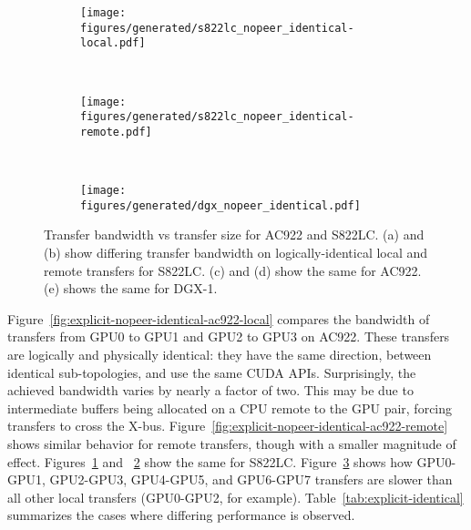 \begin{figure}[ht]
	\centering
	\begin{subfigure}[b]{0.4\textwidth}
		\texttt{[image: figures/generated/s822lc\_nopeer\_identical-local.pdf]}
		\caption{}
		\label{fig:explicit-nopeer-identical-s822lc-local}
	\end{subfigure}
	~
	\begin{subfigure}[b]{0.4\textwidth}
		\texttt{[image: figures/generated/s822lc\_nopeer\_identical-remote.pdf]}
		\caption{}
		\label{fig:explicit-nopeer-identical-s822lc-remote}
	\end{subfigure}
	\\
	\begin{subfigure}[b]{0.4\textwidth}
		\texttt{[image: figures/generated/dgx\_nopeer\_identical.pdf]}
		\caption{}
		\label{fig:explicit-nopeer-identical-dgx}
	\end{subfigure}
	\caption[GPU-GPU \texttt{cudaMemcpy} Bandwidth on Identical Links]{
		Transfer bandwidth vs transfer size for AC922 and S822LC.
		(a) and (b) show differing transfer bandwidth on logically-identical local and remote transfers for S822LC.
		(c) and (d) show the same for AC922.
		(e) shows the same for DGX-1.
	}
	\label{fig:explicit-nopeer-identical}
\end{figure}

Figure~\ref{fig:explicit-nopeer-identical-ac922-local} compares the bandwidth of transfers from GPU0 to GPU1 and GPU2 to GPU3 on AC922.
These transfers are logically and physically identical: they have the same direction, between identical sub-topologies, and use the same CUDA APIs.
Surprisingly, the achieved bandwidth varies by nearly a factor of two.
This may be due to intermediate buffers being allocated on a CPU remote to the GPU pair, forcing transfers to cross the X-bus.
Figure~\ref{fig:explicit-nopeer-identical-ac922-remote} shows similar behavior for remote transfers, though with a smaller magnitude of effect.
Figures~\ref{fig:explicit-nopeer-identical-s822lc-local} and ~\ref{fig:explicit-nopeer-identical-s822lc-remote} show the same for S822LC.
Figure~\ref{fig:explicit-nopeer-identical-dgx} shows how GPU0-GPU1, GPU2-GPU3, GPU4-GPU5, and GPU6-GPU7 transfers are slower than all other local transfers (GPU0-GPU2, for example).
Table~\ref{tab:explicit-identical} summarizes the cases where differing performance is observed.

